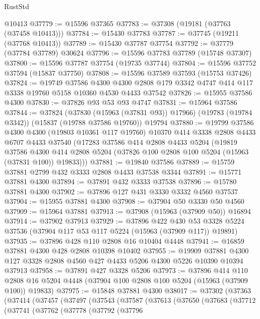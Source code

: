\begin{lexlean}{RustStd}
\begin{coremodule}
    @10413
@37779 := @15596 @37365
@37783 := @37308 (@19181 (@37763 (@37458 @10413)))
@37784 := @15430 @37783
@37787 := @37745 (@19211 (@37768 @10413))
@37789 := @15430 @37787 @37754
@37792 := @37779 (@37784 @37789) @30624
@37796 := @15596 @37783 @37789 (@15748 @37307)
@37800 := @15596 @37787 @37754 (@19735 @37744)
@37804 := @15596 @37752 @37594 (@15837 @37750)
@37808 := @15596 @37589 @37593 (@15753 @37426)
@37824 := @19749
    @37586
    @4300
    @4300
    @2808
    @179
    @3342
    @4747
    @414
    @117
    @3338
    @19760
    @5158
    @10360
    @4530
    @4433
    @37542
@37826 := @15955 @37586 @4300
@37830 := @37826 @93 @53 @93 @4747
@37831 := @15964 @37586
@37844 := @37824
    (@37830 (@15963 (@37831 @93)) @17966)
    (@19783 (@19784 @3342))
    (@15837 (@19788 @37586 @19760))
    @19794
@37880 := @19799
    @37586
    @4300
    @4300
    (@19803 @10361 @117 @19760)
    @10370
    @414
    @3338
    @2808
    @4433
    @6707
    @4433
    @37540
    (@17283
      @37586
      @414
      @2808
      @4433
      @5204
      (@19819
        @37586
        @4300
        @414
        @2808
        @5204
        (@37826 @100 @2808 @100 @5204 (@15963 (@37831 @100)) @19833)))
@37881 := @19840 @37586
@37889 := @15759 @37881 @2799 @432 @3333 @2808 @4433 @37538 @3344
@37891 := @15771 @37881 @4300
@37894 := @37891 @432 @3333 @37538
@37896 := @15780 @37881 @4300
@37902 := @37896 @127 @431 @3330 @3332 @4560 @37537
@37904 := @15955 @37881 @4300
@37908 := @37904 @50 @3330 @50 @4560
@37909 := @15964 @37881
@37913 := @37908 (@15963 (@37909 @50)) @16894
@37914 := @37902 @37913
@37929 := @37896
    @422
    @430
    @53
    @3328
    @5224
    @37536
    (@37904 @117 @53 @117 @5224 (@15963 (@37909 @117)) @19891)
@37935 := @37896 @428 @110 @2808 @16 @10404 @4448
@37941 := @16859 @37881 @4300 @428 @2808 @10398 @10402
@37955 := @19909
    @37881
    @4300
    @127
    @3328
    @2808
    @4560
    @427
    @4433
    @5206
    @4300
    @5226
    @10390
    @10394
    @37913
@37958 := @37891 @427 @3328 @5206
@37973 := @37896
    @414
    @110
    @2808
    @16
    @5204
    @4448
    (@37904 @100 @2808 @100 @5204 (@15963 (@37909 @100)) @19833)
@37975 := @15848 @37881 @4300
@38017 := @37302
    (@37363
      (@37414
        (@37457
          (@37497
            (@37543
              (@37587
                (@37613
                  (@37650
                    (@37683
                      (@37712
                        (@37741
                          (@37762
                            (@37778
                              (@37792
                                (@37796

\end{coremodule}
\end{lexlean}
